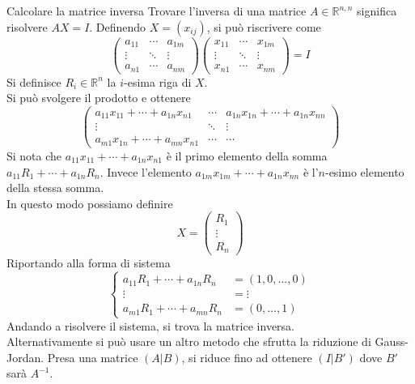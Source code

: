 \begin{SubDef}{Calcolare la matrice inversa}
  Trovare l'inversa di una matrice $A\in\mathbb{R}^{n,n}$ significa risolvere $AX = I$.
  Definendo $X = (x_{ij})$, si può riscrivere come
  \begin{equation*}
    \begin{pmatrix}
      a_{11} & \cdots & a_{1m}\\
      \vdots & \ddots & \vdots\\
      a_{n1} & \cdots & a_{nm}
    \end{pmatrix}
    \begin{pmatrix}
      x_{11} & \cdots & x_{1m}\\
      \vdots & \ddots & \vdots\\
      x_{n1} & \cdots & x_{nm}
    \end{pmatrix} = I
  \end{equation*}
  Si definisce $R_i\in\mathbb{R}^n$ la $i$-esima riga di $X$.\\
  Si può svolgere il prodotto e ottenere
  \begin{equation*}
    \begin{pmatrix}
      a_{11}x_{11}+\cdots+a_{1n}x_{n1} & \cdots & a_{1n}x_{1n}+\cdots+a_{1n}x_{nn}\\
      \vdots & \ddots & \vdots\\
      a_{m1}x_{1n}+\cdots+a_{mn}x_{n1} & \cdots & \cdots
    \end{pmatrix}
  \end{equation*}
  Si nota che $a_{11}x_{11}+\cdots+a_{1n}x_{n1}$ è il primo elemento della somma
  $a_{11}R_1+\cdots+a_{1n}R_n$. Invece l'elemento $a_{1m}x_{1m}+\cdots+a_{1n}x_{nn}$ è
  l'$n$-esimo elemento della stessa somma.\\
  In questo modo possiamo definire
  \begin{equation*}
    X =
    \begin{pmatrix}
      R_1\\
      \vdots\\
      R_n
    \end{pmatrix}
  \end{equation*}
  Riportando alla forma di sistema
  \begin{equation*}
    \begin{cases}
      a_{11}R_1 + \cdots+a_{1n}R_n &= (1,0,\ldots,0)\\
      \vdots &= \vdots\\
      a_{m1}R_1+\cdots+a_{mn}R_n &= (0,\ldots,1)
    \end{cases}
  \end{equation*}
  Andando a risolvere il sistema, si trova la matrice inversa.\\
  Alternativamente si può usare un altro metodo che sfrutta la riduzione di
  Gauss-Jordan. Presa una matrice $(A\vert B)$, si riduce fino ad ottenere $(I\vert B')$
  dove $B'$ sarà $A^{-1}$.
\end{SubDef}

